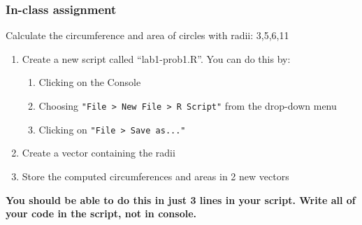 \documentclass[color=usenames,dvipsnames]{beamer}\usepackage[]{graphicx}\usepackage[]{color}
\begin{document}
\begin{frame}[fragile]
  \frametitle{In-class assignment}
  {Calculate the circumference and area of circles with radii: 3,5,6,11} \\
  \pause
  \vspace{0.5cm}
  \begin{enumerate}[\bf (1)]
    \item Create a new script called ``lab1-prob1.R''. You can do this by:
      \begin{enumerate}[i]
        \item Clicking on the Console
        \item Choosing \verb_"File > New File > R Script"_ from the drop-down menu
        \item Clicking on \verb_"File > Save as..."_
      \end{enumerate}
    \item Create a vector containing the radii
    \item Store the computed circumferences and areas in 2 new vectors
  \end{enumerate}
  \vspace{1cm}
  \centering
  {\bf You should be able to do this in just 3 lines in your
    script. Write all of your code in the script, not in console. \\}
\end{frame}




\end{document}
